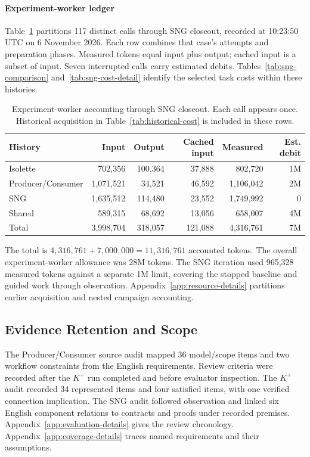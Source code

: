 \paragraph{Experiment-worker ledger}
Table~\ref{tab:ledger-scope} partitions 117 distinct calls through SNG closeout, recorded at 10:23:50 UTC on 6 November 2026. Each row combines that case's attempts and preparation phases. Measured tokens equal input plus output; cached input is a subset of input. Seven interrupted calls carry estimated debits. Tables~\ref{tab:sng-comparison} and~\ref{tab:sng-cost-detail} identify the selected task costs within these histories.

\begin{table}[!htbp]
\caption{Experiment-worker accounting through SNG closeout. Each call appears once. Historical acquisition in Table~\ref{tab:historical-cost} is included in these rows.}
\label{tab:ledger-scope}
\centering\small
\begin{tabular}{@{}lrrrrr@{}}
\hline
History & Input & Output & Cached input & Measured & Est. debit \\
\hline
Isolette & 702,356 & 100,364 & 37,888 & 802,720 & 1M \\
Producer/Consumer & 1,071,521 & 34,521 & 46,592 & 1,106,042 & 2M \\
SNG & 1,635,512 & 114,480 & 23,552 & 1,749,992 & 0 \\
Shared & 589,315 & 68,692 & 13,056 & 658,007 & 4M \\
\hline
Total & 3,998,704 & 318,057 & 121,088 & 4,316,761 & 7M \\
\hline
\end{tabular}
\end{table}

The total is $4{,}316{,}761+7{,}000{,}000=11{,}316{,}761$ accounted tokens. The overall experiment-worker allowance was 28M tokens. The SNG iteration used 965,328 measured tokens against a separate 1M limit, covering the stopped baseline and guided work through observation. Appendix~\ref{app:resource-details} partitions earlier acquisition and nested campaign accounting.

\subsection{Evidence Retention and Scope}
The Producer/Consumer source audit mapped 36 model/scope items and two workflow constraints from the English requirements. Review criteria were recorded after the $K^{+}$ run completed and before evaluator inspection. The $K^{+}$ audit recorded 34 represented items and four satisfied items, with one verified connection implication. The SNG audit followed observation and linked six English component relations to contracts and proofs under recorded premises. Appendix~\ref{app:evaluation-details} gives the review chronology. Appendix~\ref{app:coverage-details} traces named requirements and their assumptions.

